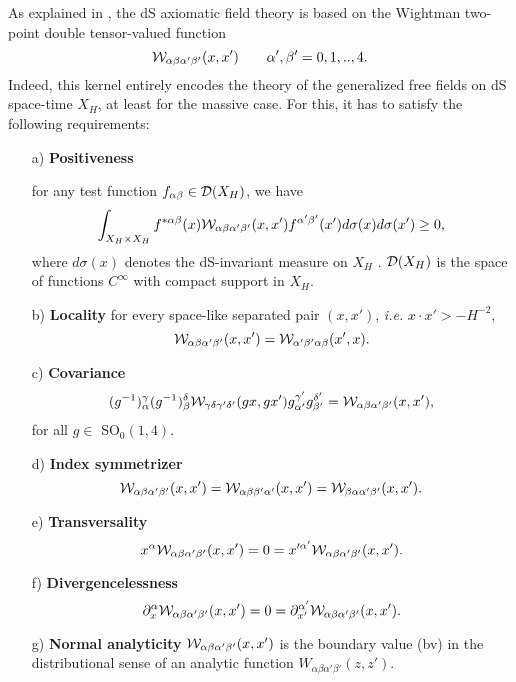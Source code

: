 \documentclass[a4paper,11pt,showpacs,preprintnumbers]{revtex4}
\begin{document}
As explained in \cite{brmo}, the dS axiomatic field theory is
based on the Wightman two-point double tensor-valued function
\begin{equation}
{\cal W}_{\alpha\beta\alpha'\beta'}(x,x')\qquad
\alpha',\beta'=0,1,..,4. \label{eq:def}
\end{equation}
Indeed, this kernel entirely encodes the theory of the generalized
free fields on dS space-time $X_H$, at least for the massive case.
For this, it has to satisfy the following requirements:
\begin{enumerate}
\item[a)] {\bf Positiveness}

for any test function $f_{\alpha \beta}\in {\cal
D}(X_H)$, we have
\begin{equation}
\int _{X_H \times X_H}f^{*\alpha\beta}(x) {\cal
W}_{\alpha\beta\alpha'\beta'}(x,x')
f^{\alpha'\beta'}(x')d\sigma(x)d\sigma(x')\geq 0,
\end{equation}
where $d\sigma (x)$ denotes the dS-invariant measure on $X_H$
\cite{brmo}. ${\cal D}(X_H)$ is the space of functions $C^\infty$
with compact support in $X_H$.

\item[b)] {\bf Locality}
for every space-like separated pair $(x,x')$, {\it i.e.} $x\cdot
x'>-H^{-2}$,
\begin{equation}
{\cal W}_{\alpha\beta \alpha'\beta'}(x,x')={\cal
W}_{\alpha'\beta'\alpha\beta }(x',x) .
\end{equation}
\item[c)] {\bf Covariance}
\begin{equation}
(g^{-1})^{\gamma}_{\alpha}(g^{-1})^{\delta}_{\beta} {\cal
W}_{\gamma\delta \gamma'\delta'} (g x,g x')g^{\gamma'}_{\alpha'}
g^{\delta'}_{\beta'}= {\cal W}_{\alpha\beta \alpha'\beta'}(x,x'),
\end{equation}
for all $g\in$ SO$_0(1,4)$.
\item[d)] {\bf Index symmetrizer}
\begin{equation}
{\cal W}_{\alpha\beta \alpha'\beta'}(x,x')={\cal W}_{\alpha\beta
\beta'\alpha '}(x,x')={\cal W}_{\beta\alpha\alpha'\beta'}(x,x').
\end{equation}
\item[e)] {\bf Transversality}
\begin{equation}
x^\alpha {\cal W}_{\alpha\beta \alpha'\beta'}(x,x')=0=x'^{\alpha'}
{\cal W}_{\alpha\beta\alpha'\beta'}(x,x') .
\end{equation}
\item[f)] {\bf Divergencelessness}
\begin{equation} \partial_x^\alpha {\cal
W}_{\alpha\beta
\alpha'\beta'}(x,x')=0=\partial_{x'}^{\alpha'}
{\cal W}_{\alpha\beta \alpha'\beta'}(x,x').
\end{equation}
\item[g)] {\bf Normal analyticity}
${\cal W}_{\alpha\beta \alpha'\beta'}(x,x')$ is the boundary value
(bv) in the distributional sense of an analytic function
$W_{\alpha\beta \alpha'\beta'}(z,z').$
\end{enumerate}
\end{document}
